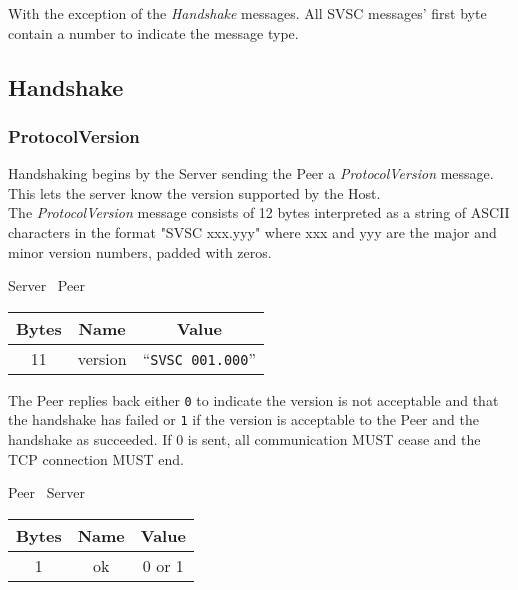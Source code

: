 \documentclass{article}
\begin{document}
    With the exception of the \emph{Handshake} messages. All SVSC messages' first byte contain a number to indicate
    the message type.

    \subsection{Handshake}

    \subsubsection{ProtocolVersion}

    Handshaking begins by the Server sending the Peer a \emph{ProtocolVersion} message. This lets the server know
    the version supported by the Host.\\

    The \emph{ProtocolVersion} message consists of 12 bytes interpreted as a string of ASCII characters in the format
    "SVSC xxx.yyy" where xxx and yyy are the major and minor version numbers, padded with zeros.

    \begin{center}
        Server \textrightarrow\ Peer\\
        \begin{tabular}{|c|c|c|}
            \hline
            \textbf{Bytes} & \textbf{Name} & \textbf{Value}            \\
            \hline
            11             & version       & ``\texttt{SVSC 001.000}'' \\
            \hline
        \end{tabular}
    \end{center}

    The Peer replies back either \texttt{0} to indicate the version is not acceptable and that the handshake has
    failed or \texttt{1} if the version is acceptable to the Peer and the handshake as succeeded. If 0 is sent, all
    communication MUST cease and the TCP connection MUST end.

    \begin{center}
        Peer \textrightarrow\ Server\\
        \begin{tabular}{|c|c|c|}
            \hline
            \textbf{Bytes} & \textbf{Name} & \textbf{Value} \\
            \hline
            1              & ok            & 0 or 1         \\
            \hline
        \end{tabular}
    \end{center}
\end{document}
